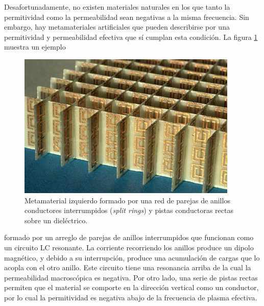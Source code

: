 \documentclass[12pt]{article}
\begin{document}
Desafortunadamente, no existen materiales naturales en los que tanto
la permitividad como la permeabilidad sean negativas a la misma
frecuencia. Sin embargo, hay metamateriales artificiales que pueden
describirse por una permitividad y permeabilidad efectiva que sí
cumplan esta condición. La figura \ref{fig:rings} muestra un ejemplo
\begin{figure}
  \centering
  \includegraphics[width=.7\textwidth]{splitResonator}
  \caption{Metamaterial izquierdo formado por una red de parejas de
    anillos conductores interrumpidos ({\em split rings}) y pistas
    conductoras rectas sobre un dieléctrico. }
  \label{fig:rings}
\end{figure}
formado por un arreglo de parejas de anillos interrumpidos que
funcionan como un circuito LC resonante. La corriente recorriendo los
anillos produce un dipolo magnético, y debido a su interrupción,
produce una acumulación de cargas que lo acopla con el otro
anillo. Este circuito tiene una resonancia arriba de la cual la
permeabilidad macroscópica es negativa. Por otro lado, una serie de
pistas rectas permiten que el material se comporte en la dirección
vertical como un conductor, por lo cual la permitividad es negativa
abajo de la frecuencia de plasma efectiva.
\end{document}
